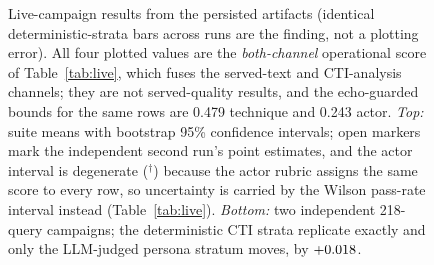\begin{figure}[t]
\caption{Live-campaign results from the persisted artifacts (identical
deterministic-strata bars across runs are the finding, not a plotting
error). All four plotted values are the \emph{both-channel} operational
score of Table~\ref{tab:live}, which fuses the served-text and CTI-analysis
channels; they are not served-quality results, and the echo-guarded bounds
for the same rows are 0.479 technique and 0.243 actor.
\emph{Top:}
suite means with bootstrap 95\% confidence intervals; open markers mark
the independent second run's point estimates, and the actor interval is
degenerate ($^{\dagger}$) because the actor rubric assigns the same
score to every row, so uncertainty is carried by the Wilson pass-rate
interval instead (Table~\ref{tab:live}). \emph{Bottom:} two independent
218-query campaigns; the deterministic CTI strata replicate exactly and
only the LLM-judged persona stratum moves, by $+0.018$.}
\label{fig:results}
\end{figure}
